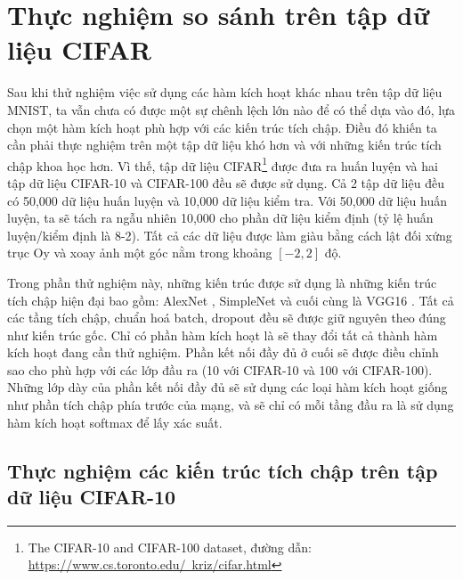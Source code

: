 \chapter{Thực nghiệm so sánh trên tập dữ liệu CIFAR}\label{chap:thucnghiemcifar}

Sau khi thử nghiệm việc sử dụng các hàm kích hoạt khác nhau trên tập dữ liệu MNIST, ta vẫn chưa có được một sự chênh lệch lớn nào để có thể dựa vào đó, lựa chọn một hàm kích hoạt phù hợp với các kiến trúc tích chập.
Điều đó khiến ta cần phải thực nghiệm trên một tập dữ liệu khó hơn và với những kiến trúc tích chập khoa học hơn.
Vì thế, tập dữ liệu CIFAR\footnote{The CIFAR-10 and CIFAR-100 dataset, đường dẫn: \href{https://www.cs.toronto.edu/~kriz/cifar.html}{https://www.cs.toronto.edu/~kriz/cifar.html}} được đưa ra huấn luyện và hai tập dữ liệu CIFAR-10 và CIFAR-100 đều sẽ được sử dụng.
Cả 2 tập dữ liệu đều có 50,000 dữ liệu huấn luyện và 10,000 dữ liệu kiểm tra.
Với 50,000 dữ liệu huấn luyện, ta sẽ tách ra ngẫu nhiên 10,000 cho phần dữ liệu kiểm định (tỷ lệ huấn luyện/kiểm định là 8-2).
Tất cả các dữ liệu được làm giàu bằng cách lật đối xứng trục Oy và xoay ảnh một góc nằm trong khoảng $[-2, 2]$ độ.
\vspace{5pt}

Trong phần thử nghiệm này, những kiến trúc được sử dụng là những kiến trúc tích chập hiện đại bao gồm: AlexNet \cite{imagenethinton, alexnetkeras}, SimpleNet \cite{hasanpour2018lets, simplenetkeras} và cuối cùng là VGG16 \cite{simonyan2015deep, vgg16keras}.
Tất cả các tầng tích chập, chuẩn hoá batch, dropout đều sẽ được giữ nguyên theo đúng như kiến trúc gốc.
Chỉ có phần hàm kích hoạt là sẽ thay đổi tất cả thành hàm kích hoạt đang cần thử nghiệm.
Phần kết nối đầy đủ ở cuối sẽ được điều chỉnh sao cho phù hợp với các lớp đầu ra (10 với CIFAR-10 và 100 với CIFAR-100).
Những lớp dày của phần kết nối đầy đủ sẽ sử dụng các loại hàm kích hoạt giống như phần tích chập phía trước của mạng, và sẽ chỉ có mỗi tầng đầu ra là sử dụng hàm kích hoạt softmax để lấy xác suất.

\section{Thực nghiệm các kiến trúc tích chập trên tập dữ liệu CIFAR-10}\label{sec:cifar10}


